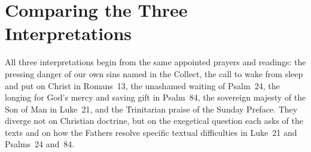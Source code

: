 \section{Comparing the Three Interpretations}

All three interpretations begin from the same appointed prayers and readings: the pressing danger of our own sins named in the Collect, the call to wake from sleep and put on Christ in Romans~13, the unashamed waiting of Psalm~24, the longing for God's mercy and saving gift in Psalm~84, the sovereign majesty of the Son of Man in Luke~21, and the Trinitarian praise of the Sunday Preface. They diverge not on Christian doctrine, but on the exegetical question each asks of the texts and on how the Fathers resolve specific textual difficulties in Luke~21 and Psalms~24 and~84.

